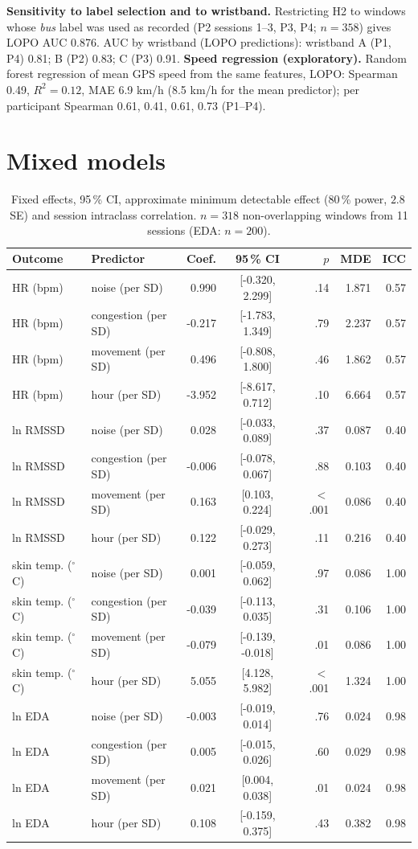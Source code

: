 \documentclass[runningheads]{llncs}
\begin{document}
\noindent \textbf{Sensitivity to label selection and to wristband.} Restricting H2 to windows whose \emph{bus} label was used as recorded (P2 sessions 1--3, P3, P4; $n=358$) gives LOPO AUC 0.876. AUC by wristband (LOPO predictions): wristband A (P1, P4) 0.81; B (P2) 0.83; C (P3) 0.91. \textbf{Speed regression (exploratory).} Random forest regression of mean GPS speed from the same features, LOPO: Spearman 0.49, $R^2=0.12$, MAE 6.9 km/h (8.5 km/h for the mean predictor); per participant Spearman 0.61, 0.41, 0.61, 0.73 (P1--P4).

\section{Mixed models}
\begin{table}[h]
\caption{Fixed effects, 95\,\% CI, approximate minimum detectable effect (80\,\% power, $2.8\,$SE) and session intraclass correlation. $n=318$ non-overlapping windows from 11 sessions (EDA: $n=200$).}
\tiny\centering
\begin{tabular}{@{}llrcrrr@{}}
\toprule
Outcome & Predictor & Coef. & 95\,\% CI & $p$ & MDE & ICC\\
\midrule
HR (bpm) & noise (per SD) & 0.990 & [-0.320, 2.299] & .14 & 1.871 & 0.57\\
HR (bpm) & congestion (per SD) & -0.217 & [-1.783, 1.349] & .79 & 2.237 & 0.57\\
HR (bpm) & movement (per SD) & 0.496 & [-0.808, 1.800] & .46 & 1.862 & 0.57\\
HR (bpm) & hour (per SD) & -3.952 & [-8.617, 0.712] & .10 & 6.664 & 0.57\\
ln RMSSD & noise (per SD) & 0.028 & [-0.033, 0.089] & .37 & 0.087 & 0.40\\
ln RMSSD & congestion (per SD) & -0.006 & [-0.078, 0.067] & .88 & 0.103 & 0.40\\
ln RMSSD & movement (per SD) & 0.163 & [0.103, 0.224] & $<$.001 & 0.086 & 0.40\\
ln RMSSD & hour (per SD) & 0.122 & [-0.029, 0.273] & .11 & 0.216 & 0.40\\
skin temp. ($^\circ$C) & noise (per SD) & 0.001 & [-0.059, 0.062] & .97 & 0.086 & 1.00\\
skin temp. ($^\circ$C) & congestion (per SD) & -0.039 & [-0.113, 0.035] & .31 & 0.106 & 1.00\\
skin temp. ($^\circ$C) & movement (per SD) & -0.079 & [-0.139, -0.018] & .01 & 0.086 & 1.00\\
skin temp. ($^\circ$C) & hour (per SD) & 5.055 & [4.128, 5.982] & $<$.001 & 1.324 & 1.00\\
ln EDA & noise (per SD) & -0.003 & [-0.019, 0.014] & .76 & 0.024 & 0.98\\
ln EDA & congestion (per SD) & 0.005 & [-0.015, 0.026] & .60 & 0.029 & 0.98\\
ln EDA & movement (per SD) & 0.021 & [0.004, 0.038] & .01 & 0.024 & 0.98\\
ln EDA & hour (per SD) & 0.108 & [-0.159, 0.375] & .43 & 0.382 & 0.98\\
\bottomrule
\end{tabular}
\end{table}
\end{document}
